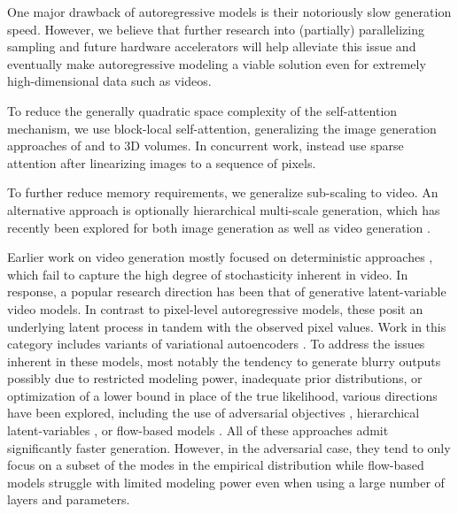 \documentclass{article} \usepackage{iclr2020_conference,times}
\begin{document}
One major drawback of autoregressive models is their notoriously slow generation speed. However, we believe that further research into (partially) parallelizing sampling \citep{Stern2018BlockwisePD} and future hardware accelerators will help alleviate this issue and eventually make autoregressive modeling a viable solution even for extremely high-dimensional data such as videos.

To reduce the generally quadratic space complexity of the self-attention mechanism, we use block-local self-attention, generalizing the image generation approaches of \citet{Parmar2018ImageT} and \citet{Chen2018PixelSNAIL} to 3D volumes. In concurrent work, \citet{Child2019SparseTransformers} instead use sparse attention after linearizing images to a sequence of pixels.

To further reduce memory requirements, we generalize sub-scaling \citep{Menick2018GeneratingHF} to video. An alternative approach is optionally hierarchical multi-scale generation, which has recently been explored for both image generation \citep{reed2017parallel,de2019hierarchical} as well as video generation \citep{Mathieu2016BeoyndMSE}.

Earlier work on video generation mostly focused on deterministic approaches \citep{Srivastava2015MovingMNIST,Vondrick2016Anticipating,xingjian2015convolutional,liu2017video,jia2016dynamic}, which fail to capture the high degree of stochasticity inherent in video.
In response, a popular research direction has been that of generative latent-variable video models. In contrast to pixel-level autoregressive models, these posit an underlying latent process in tandem with the observed pixel values. Work in this category includes variants of variational autoencoders \citep{Babaeizadeh2017SV2P, Denton2018SVGLP}. To address the issues inherent in these models, most notably the tendency to generate blurry outputs possibly due to restricted modeling power, inadequate prior distributions, or optimization of a lower bound in place of the true likelihood, various directions have been explored, including the use of adversarial objectives \citep{Mathieu2016BeoyndMSE,Vondrick2016GeneratingVideos,Lee2018SAVP}, hierarchical latent-variables \citep{Catrejon2019ConditionalVRNN}, or flow-based models \citep{Kumar2019VideoFlowAF}.
All of these approaches admit significantly faster generation. However, in the adversarial case, they tend to only focus on a subset of the modes in the empirical distribution while flow-based models struggle with limited modeling power even when using a large number of layers and parameters. 
\end{document}
